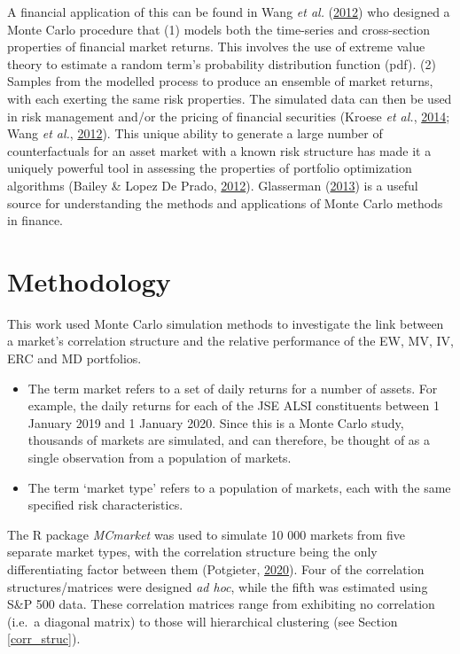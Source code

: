 \documentclass[11pt,preprint, authoryear]{elsarticle}
\numberwithin{equation}{section}
\numberwithin{figure}{section}
\numberwithin{table}{section}
\def\tightlist{} %
\begin{document}
A financial application of this can be found in Wang \emph{et al.}
(\protect\hyperlink{ref-wang2012}{2012}) who designed a Monte Carlo
procedure that (1) models both the time-series and cross-section
properties of financial market returns. This involves the use of extreme
value theory to estimate a random term's probability distribution
function (pdf). (2) Samples from the modelled process to produce an
ensemble of market returns, with each exerting the same risk properties.
The simulated data can then be used in risk management and/or the
pricing of financial securities (Kroese \emph{et al.},
\protect\hyperlink{ref-kroese2014}{2014}; Wang \emph{et al.},
\protect\hyperlink{ref-wang2012}{2012}). This unique ability to generate
a large number of counterfactuals for an asset market with a known risk
structure has made it a uniquely powerful tool in assessing the
properties of portfolio optimization algorithms (Bailey \& Lopez De
Prado, \protect\hyperlink{ref-lopez2012}{2012}). Glasserman
(\protect\hyperlink{ref-glasserman2013}{2013}) is a useful source for
understanding the methods and applications of Monte Carlo methods in
finance.

\hypertarget{methodology}{%
\section{\texorpdfstring{Methodology
\label{methadology}}{Methodology }}\label{methodology}}

This work used Monte Carlo simulation methods to investigate the link
between a market's correlation structure and the relative performance of
the EW, MV, IV, ERC and MD portfolios.

\begin{itemize}
\tightlist
\item
  The term market refers to a set of daily returns for a number of
  assets. For example, the daily returns for each of the JSE ALSI
  constituents between 1 January 2019 and 1 January 2020. Since this is
  a Monte Carlo study, thousands of markets are simulated, and can
  therefore, be thought of as a single observation from a population of
  markets.
\item
  The term `market type' refers to a population of markets, each with
  the same specified risk characteristics.
\end{itemize}

The R package \emph{MCmarket} was used to simulate 10 000 markets from
five separate market types, with the correlation structure being the
only differentiating factor between them (Potgieter,
\protect\hyperlink{ref-MCmarket}{2020}). Four of the correlation
structures/matrices were designed \emph{ad hoc}, while the fifth was
estimated using S\&P 500 data. These correlation matrices range from
exhibiting no correlation (i.e.~a diagonal matrix) to those will
hierarchical clustering (see Section \ref{corr_struc}).
\end{document}
